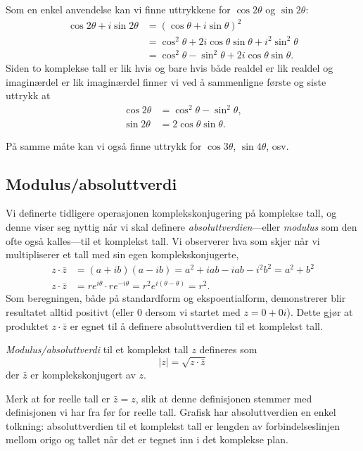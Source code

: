 \documentclass[a4paper,norsk,12pt]{article}
\newcounter{exa}
\begin{document}
\begin{texample}
Som en enkel anvendelse kan vi finne uttrykkene for $\cos2\theta$ og $\sin2\theta$:
\begin{align*}
	\cos2\theta + i\sin2\theta &= (\cos\theta + i\sin\theta)^2 \\
	&=\cos^2\theta + 2i\cos\theta\sin\theta + i^2\sin^2\theta \\
	&=\cos^2\theta-\sin^2\theta + 2i\cos\theta\sin\theta.
\end{align*}
Siden to komplekse tall er lik hvis og bare hvis både realdel er lik realdel og imaginærdel er lik imaginærdel finner vi ved å sammenligne første og siste uttrykk at 
\begin{align*}
	\cos2\theta &= \cos^2\theta - \sin^2\theta, \\
	\sin2\theta &= 2\cos\theta\sin\theta.
\end{align*}
\end{texample}
\noindent
På samme måte kan vi også finne uttrykk for $\cos3\theta$, $\sin4\theta$, osv.

\subsection{Modulus/absoluttverdi}
Vi definerte tidligere operasjonen komplekskonjugering på komplekse tall, og denne viser seg nyttig når vi skal definere \emph{absoluttverdien}---eller \emph{modulus} som den ofte også kalles---til et komplekst tall. Vi observerer hva som skjer når vi multipliserer et tall med sin egen komplekskonjugerte,
\begin{align*}
	z\cdot\bar{z} &= (a + ib)(a-ib) = a^2 + iab - iab -i^2b^2 = a^2 + b^2 \\
	z\cdot\bar{z} &= re^{i\theta}\cdot re^{-i\theta} = r^2e^{i(\theta-\theta)} = r^2.
\end{align*}
Som beregningen, både på standardform og ekspoentialform, demonstrerer blir resultatet alltid positivt (eller 0 dersom vi startet med $z=0+0i$). Dette gjør at produktet $z\cdot\bar{z}$ er egnet til å definere absoluttverdien til et komplekst tall.
\begin{tdef}
\emph{Modulus/absoluttverdi} til et komplekst tall $z$ defineres som
\begin{displaymath}
	|z| = \sqrt{z\cdot\bar{z}}
\end{displaymath}
der $\bar{z}$ er komplekskonjugert av $z$.
\end{tdef}
\noindent
Merk at for reelle tall er $\bar{z}=z$, slik at denne definisjonen stemmer med definisjonen vi har fra før for reelle tall. 
Grafisk har absoluttverdien en enkel tolkning: absoluttverdien til et komplekst tall er lengden av forbindelseslinjen mellom origo og tallet når det er tegnet inn i det komplekse plan.
\end{document}
